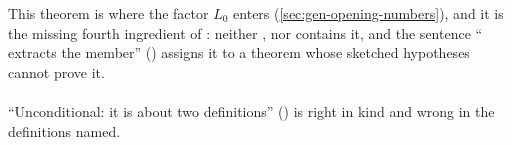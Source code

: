 This theorem is where the factor $L_0$ enters  (\cref{sec:gen-opening-numbers}), and
it is the missing fourth ingredient of : neither
,  nor  contains it, and the sentence
`` extracts the member'' () assigns it to a theorem whose
sketched hypotheses cannot prove it.

\paragraph{\texorpdfstring{}{verify_iff_compiled}}\label{sec:gen-opening-iff-compiled}

``Unconditional: it is about two definitions'' () is right in kind and wrong in
the definitions named.
